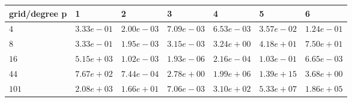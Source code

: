 \begin{tabular}{lllllll}
\hline
 grid/degree p   & 1          & 2          & 3          & 4          & 5          & 6          \\
\hline
 $4$             & $3.33e-01$ & $2.00e-03$ & $7.09e-03$ & $6.53e-03$ & $3.57e-02$ & $1.24e-01$ \\
 $8$             & $3.33e-01$ & $1.95e-03$ & $3.15e-03$ & $3.24e+00$ & $4.18e+01$ & $7.50e+01$ \\
 $16$            & $5.15e+03$ & $1.02e-03$ & $1.93e-06$ & $2.16e-04$ & $1.03e-01$ & $6.65e-03$ \\
 $44$            & $7.67e+02$ & $7.44e-04$ & $2.78e+00$ & $1.99e+06$ & $1.39e+15$ & $3.68e+00$ \\
 $101$           & $2.08e+03$ & $1.66e+01$ & $7.06e-03$ & $3.10e+02$ & $5.33e+07$ & $1.86e+05$ \\
\hline
\end{tabular}